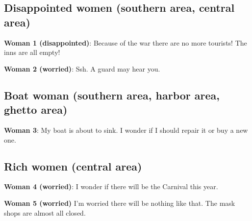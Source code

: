 \subsection{Disappointed women (southern area, central area)}
\textbf{Woman 1 (disappointed)}: Because of the war there are no more tourists! The inns are all empty!

\textbf{Woman 2 (worried)}: Ssh. A guard may hear you.

\subsection{Boat woman (southern area, harbor area, ghetto area)}
\textbf{Woman 3}: My boat is about to sink. I wonder if I should repair it or buy a new one.

\subsection{Rich women (central area)}
\textbf{Woman 4 (worried)}: I wonder if there will be the Carnival this year.

\textbf{Woman 5 (worried)} I'm worried there will be nothing like that. The mask shops are almost all closed.
